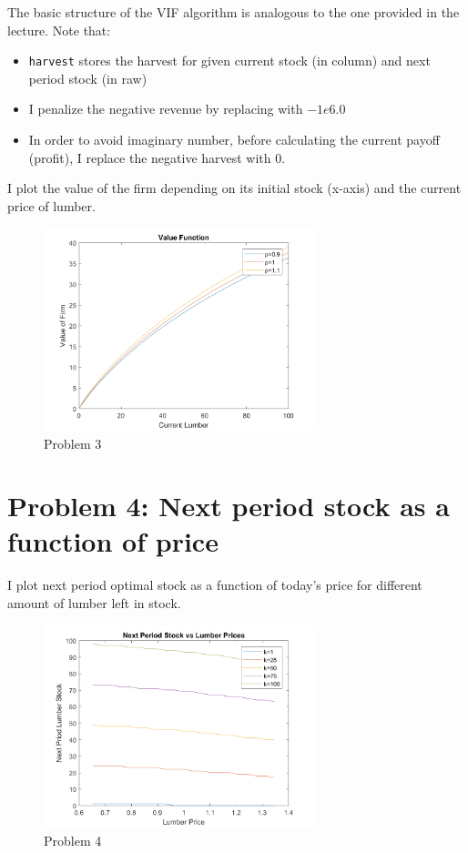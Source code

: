 \documentclass[11pt,letter]{article}
\newcounter{lem}[section] \setcounter{lem}{0}
\newcommand{\code}[1]{\texttt{#1}}
\begin{document}
The basic structure of the VIF algorithm is analogous to the one provided in the lecture. Note that:
\begin{itemize}
\item \code{harvest} stores the harvest for given current stock (in column) and next period stock (in raw)
\item I penalize the negative revenue by replacing with $-1e6.0$
\item In order to avoid imaginary number, before calculating the current payoff (profit), I replace the negative harvest with 0.
\end{itemize}
 
I plot the value of the firm depending on its initial stock (x-axis) and the current price of lumber. 

\begin{figure}[h]
\begin{center}
\caption{Problem 3}
\includegraphics[width=0.7\textwidth]{prob3.png}
\end{center}
\end{figure}

\newpage
\section*{Problem 4: Next period stock as a function of price}

I plot next period optimal stock as a function of today's price for different amount of lumber left in stock.

\begin{figure}[h]
\begin{center}
\caption{Problem 4}
\includegraphics[width=0.7\textwidth]{prob4.png}
\end{center}
\end{figure}
\end{document}
